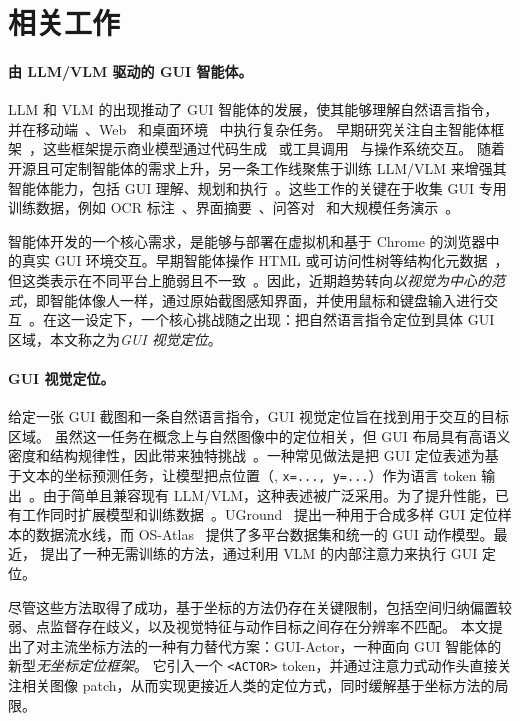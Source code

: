 \section{相关工作}

\paragraph{由 LLM/VLM 驱动的 GUI 智能体。}
LLM 和 VLM 的出现推动了 GUI 智能体的发展，使其能够理解自然语言指令，并在移动端~\citep{rawles2024androidworld}、Web~\citep{zhou2023webarena, deng2023mind2web} 和桌面环境~\citep{xie2024osworld, zhang2024ufo, zhang2025ufo2} 中执行复杂任务。
早期研究关注自主智能体框架~\citep{zheng2024gpt, wu2024copilot, jia2024agentstore}，这些框架提示商业模型通过代码生成~\citep{sun2024survey, sun2025scienceboard} 或工具调用~\citep{zhang2025appagent,zhang2025api} 与操作系统交互。
随着开源且可定制智能体的需求上升，另一条工作线聚焦于训练 LLM/VLM 来增强其智能体能力，包括 GUI 理解、规划和执行~\citep{xu2024aguvis, qin2025ui, chen2024guicourse, chai2024amex}。这些工作的关键在于收集 GUI 专用训练数据，例如 OCR 标注~\citep{lu2024gui}、界面摘要~\citep{you2024ferret}、问答对~\citep{chen2024guicourse} 和大规模任务演示~\citep{deng2023mind2web, rawles2023androidinthewild, zhang2024android, zheng2025vem, sun2024genesis, cheng2024vision, zhang2025breaking}。

智能体开发的一个核心需求，是能够与部署在虚拟机和基于 Chrome 的浏览器中的真实 GUI 环境交互。早期智能体操作 HTML 或可访问性树等结构化元数据~\citep{zhou2023webarena, he2024webvoyager}，但这类表示在不同平台上脆弱且不一致~\citep{cheng2024seeclick, xu2024aguvis}。因此，近期趋势转向\emph{以视觉为中心的范式}，即智能体像人一样，通过原始截图感知界面，并使用鼠标和键盘输入进行交互~\citep{openai2025operator, anthropic2024cuda}。在这一设定下，一个核心挑战随之出现：把自然语言指令定位到具体 GUI 区域，本文称之为\textit{GUI 视觉定位}。

\paragraph{GUI 视觉定位。}
给定一张 GUI 截图和一条自然语言指令，GUI 视觉定位旨在找到用于交互的目标区域。
虽然这一任务在概念上与自然图像中的定位相关，但 GUI 布局具有高语义密度和结构规律性，因此带来独特挑战~\citep{cheng2024seeclick, gou2024navigating}。一种常见做法是把 GUI 定位表述为基于文本的坐标预测任务，让模型把点位置（\eg, \texttt{x=..., y=...}）作为语言 token 输出~\citep{chen2023shikra, wang2024qwen2}。由于简单且兼容现有 LLM/VLM，这种表述被广泛采用。为了提升性能，已有工作同时扩展模型和训练数据~\citep{lin2024showui, yang2024aria, pawlowski2024tinyclick, tang2025think, bai2025qwen2, qin2025ui, xie2025scaling}。UGround~\citep{gou2024navigating} 提出一种用于合成多样 GUI 定位样本的数据流水线，而 OS-Atlas~\citep{wu2024atlas} 提供了多平台数据集和统一的 GUI 动作模型。最近，\citet{xu2025attention} 提出了一种无需训练的方法，通过利用 VLM 的内部注意力来执行 GUI 定位。

尽管这些方法取得了成功，基于坐标的方法仍存在关键限制，包括空间归纳偏置较弱、点监督存在歧义，以及视觉特征与动作目标之间存在分辨率不匹配。
本文提出了对主流坐标方法的一种有力替代方案：GUI-Actor，一种面向 GUI 智能体的新型\textit{无坐标定位框架}。
它引入一个 \texttt{<ACTOR>} token，并通过注意力式动作头直接关注相关图像 patch，从而实现更接近人类的定位方式，同时缓解基于坐标方法的局限。
